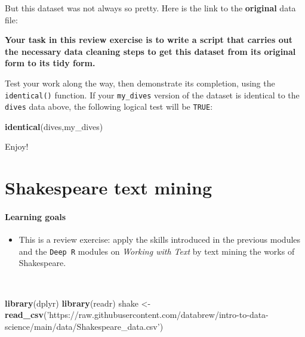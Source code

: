 \documentclass[]{book}
\newenvironment{Shaded}{\begin{snugshade}}{\end{snugshade}}
\newcommand{\KeywordTok}[1]{\textcolor[rgb]{0.13,0.29,0.53}{\textbf{#1}}}
\newcommand{\NormalTok}[1]{#1}
\newcommand{\StringTok}[1]{\textcolor[rgb]{0.31,0.60,0.02}{#1}}
\providecommand{\tightlist}{%
  \setlength{\itemsep}{0pt}\setlength{\parskip}{0pt}}
\begin{document}
But this dataset was not always so pretty. Here is the link to the \textbf{original} data file:

\textbf{Your task in this review exercise is to write a script that carries out the necessary data cleaning steps to get this dataset from its original form to its tidy form.}

Test your work along the way, then demonstrate its completion, using the \texttt{identical()} function. If your \texttt{my\_dives} version of the dataset is identical to the \texttt{dives} data above, the following logical test will be \texttt{TRUE}:

\begin{Shaded}
\begin{Highlighting}[]
\KeywordTok{identical}\NormalTok{(dives,my_dives)}
\end{Highlighting}
\end{Shaded}

Enjoy!

\hypertarget{shakespeare-text-mining}{%
\chapter{Shakespeare text mining}\label{shakespeare-text-mining}}

\hypertarget{learning-goals-22}{%
\subsubsection*{Learning goals}\label{learning-goals-22}}

\begin{itemize}
\tightlist
\item
  This is a review exercise: apply the skills introduced in the previous modules and the \texttt{Deep\ R} modules on \emph{Working with Text} by text mining the works of Shakespeare.
\end{itemize}

~

\begin{Shaded}
\begin{Highlighting}[]
\KeywordTok{library}\NormalTok{(dplyr)}
\KeywordTok{library}\NormalTok{(readr)}
\NormalTok{shake <-}\StringTok{ }\KeywordTok{read_csv}\NormalTok{(}\StringTok{'https://raw.githubusercontent.com/databrew/intro-to-data-science/main/data/Shakespeare_data.csv'}\NormalTok{)}
\end{Highlighting}
\end{Shaded}
\end{document}
